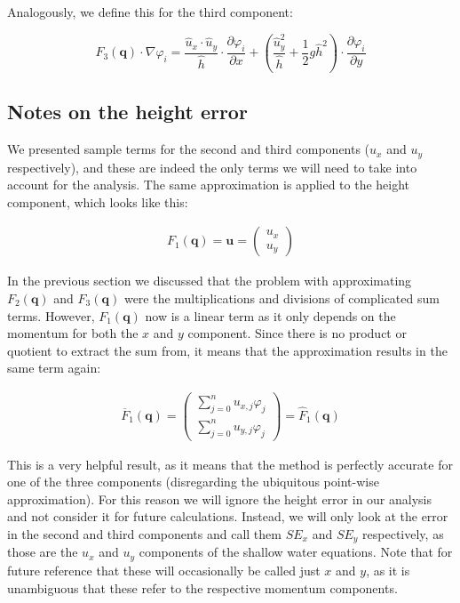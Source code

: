 \documentclass[a4paper, twoside]{article}
\newcommand{\pd}[2]{\dfrac{\partial #1}{\partial #2}}
\renewcommand{\phi}{\varphi}
\begin{document}
Analogously, we define this for the third component:

\begin{equation}
  \label{eq:stiffness-analysis-third-line-exact-approx-simple}
  \widehat{F}_3(\mathbf{q}) \cdot \nabla \phi_i =
  \frac{\widehat{u}_x \cdot \widehat{u}_y }{\widehat{h}} \cdot \pd{\phi_i}{x} +
  \left( \frac{\widehat{u}_y^2}{\widehat{h}} + \frac{1}{2} g \widehat{h}^2 \right) \cdot \pd{\phi_i}{y}
\end{equation}

\subsection{Notes on the height error}
\label{sec:stiffness-height-error}

We presented sample terms for the second and third components ($u_x$ and $u_y$ respectively), and these are indeed the only terms we will need to take into account for the analysis. The same approximation is applied to the height component, which looks like this:

\begin{eqnarray*}
  F_1(\mathbf{q}) =
  \mathbf{u} =
  \begin{pmatrix}
    u_x \\
    u_y
  \end{pmatrix}
\end{eqnarray*}

In the previous section we discussed that the problem with approximating $F_2(\mathbf{q})$ and $F_3(\mathbf{q})$ were the multiplications and divisions of complicated sum terms. However, $F_1(\mathbf{q})$ now is a linear term as it only depends on the momentum for both the $x$ and $y$ component. Since there is no product or quotient to extract the sum from, it means that the approximation results in the same term again:

\begin{eqnarray}
  \label{eq:stiffness-height-error}
  \overline{F}_1(\mathbf{q}) =
  \begin{pmatrix}
    \sum_{j=0}^{n} u_{x,j} \phi_j \\
    \sum_{j=0}^{n} u_{y,j} \phi_j
  \end{pmatrix} =
  \widehat{F}_1(\mathbf{q})
\end{eqnarray}

This is a very helpful result, as it means that the method is perfectly accurate for one of the three components (disregarding the ubiquitous point-wise approximation). For this reason we will ignore the height error in our analysis and not consider it for future calculations. Instead, we will only look at the error in the second and third components and call them $SE_x$ and $SE_y$ respectively, as those are the $u_x$ and $u_y$ components of the shallow water equations. Note that for future reference that these will occasionally be called just $x$ and $y$, as it is unambiguous that these refer to the respective momentum components.
\end{document}

